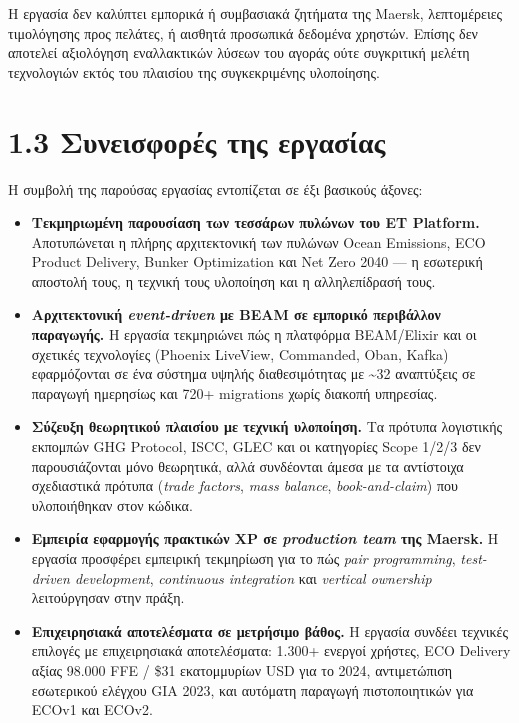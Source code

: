Η εργασία δεν καλύπτει εμπορικά ή συμβασιακά ζητήματα της Maersk,
λεπτομέρειες τιμολόγησης προς πελάτες, ή αισθητά προσωπικά δεδομένα
χρηστών. Επίσης δεν αποτελεί αξιολόγηση εναλλακτικών λύσεων του αγοράς
ούτε συγκριτική μελέτη τεχνολογιών εκτός του πλαισίου της συγκεκριμένης
υλοποίησης.

\section{1.3 Συνεισφορές της
εργασίας}\label{ux3c3ux3c5ux3bdux3b5ux3b9ux3c3ux3c6ux3bfux3c1ux3adux3c2-ux3c4ux3b7ux3c2-ux3b5ux3c1ux3b3ux3b1ux3c3ux3afux3b1ux3c2}

Η συμβολή της παρούσας εργασίας εντοπίζεται σε έξι βασικούς άξονες:

\begin{itemize}
\item
  \textbf{Τεκμηριωμένη παρουσίαση των τεσσάρων πυλώνων του ET Platform.}
  Αποτυπώνεται η πλήρης αρχιτεκτονική των πυλώνων Ocean Emissions, ECO
  Product Delivery, Bunker Optimization και Net Zero 2040 --- η
  εσωτερική αποστολή τους, η τεχνική τους υλοποίηση και η αλληλεπίδρασή
  τους.
\item
  \textbf{Αρχιτεκτονική \emph{event-driven} με BEAM σε εμπορικό
  περιβάλλον παραγωγής.} Η εργασία τεκμηριώνει πώς η πλατφόρμα
  BEAM/Elixir και οι σχετικές τεχνολογίες (Phoenix LiveView, Commanded,
  Oban, Kafka) εφαρμόζονται σε ένα σύστημα υψηλής διαθεσιμότητας με
  \textasciitilde32 αναπτύξεις σε παραγωγή ημερησίως και 720+ migrations
  χωρίς διακοπή υπηρεσίας.
\item
  \textbf{Σύζευξη θεωρητικού πλαισίου με τεχνική υλοποίηση.} Τα πρότυπα
  λογιστικής εκπομπών GHG Protocol, ISCC, GLEC και οι κατηγορίες Scope
  1/2/3 δεν παρουσιάζονται μόνο θεωρητικά, αλλά συνδέονται άμεσα με τα
  αντίστοιχα σχεδιαστικά πρότυπα (\emph{trade factors}, \emph{mass
  balance}, \emph{book-and-claim}) που υλοποιήθηκαν στον κώδικα.
\item
  \textbf{Εμπειρία εφαρμογής πρακτικών XP σε \emph{production team} της
  Maersk.} Η εργασία προσφέρει εμπειρική τεκμηρίωση για το πώς
  \emph{pair programming}, \emph{test-driven development},
  \emph{continuous integration} και \emph{vertical ownership}
  λειτούργησαν στην πράξη.
\item
  \textbf{Επιχειρησιακά αποτελέσματα σε μετρήσιμο βάθος.} Η εργασία
  συνδέει τεχνικές επιλογές με επιχειρησιακά αποτελέσματα: 1.300+
  ενεργοί χρήστες, ECO Delivery αξίας 98.000 FFE / \$31 εκατομμυρίων USD
  για το 2024, αντιμετώπιση εσωτερικού ελέγχου GIA 2023, και αυτόματη
  παραγωγή πιστοποιητικών για ECOv1 και ECOv2.
\end{itemize}

